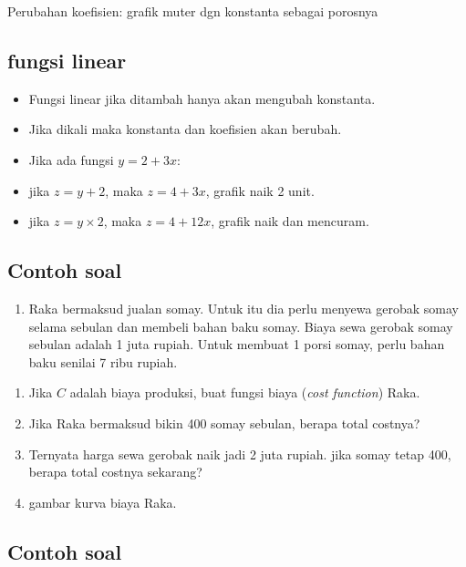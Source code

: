 \documentclass[
  letterpaper,
  DIV=11,
  numbers=noendperiod]{scrartcl}
\providecommand{\tightlist}{%
  \setlength{\itemsep}{0pt}\setlength{\parskip}{0pt}}\usepackage{longtable,booktabs,array}
\begin{document}
Perubahan koefisien: grafik muter dgn konstanta sebagai porosnya

\hypertarget{fungsi-linear-3}{%
\subsection{fungsi linear}\label{fungsi-linear-3}}

\begin{itemize}
\item
  Fungsi linear jika ditambah hanya akan mengubah konstanta.
\item
  Jika dikali maka konstanta dan koefisien akan berubah.
\item
  Jika ada fungsi \(y=2+3x\):
\item
  jika \(z=y+2\), maka \(z=4+3x\), grafik naik 2 unit.
\item
  jika \(z=y \times 2\), maka \(z=4+12x\), grafik naik dan mencuram.
\end{itemize}

\hypertarget{contoh-soal-1}{%
\subsection{Contoh soal}\label{contoh-soal-1}}

\begin{enumerate}
\def\labelenumi{\arabic{enumi}.}
\tightlist
\item
  Raka bermaksud jualan somay. Untuk itu dia perlu menyewa gerobak somay
  selama sebulan dan membeli bahan baku somay. Biaya sewa gerobak somay
  sebulan adalah 1 juta rupiah. Untuk membuat 1 porsi somay, perlu bahan
  baku senilai 7 ribu rupiah.
\end{enumerate}

\begin{enumerate}
\def\labelenumi{\alph{enumi}.}
\tightlist
\item
  Jika \(C\) adalah biaya produksi, buat fungsi biaya (\emph{cost
  function}) Raka.
\item
  Jika Raka bermaksud bikin 400 somay sebulan, berapa total costnya?
\item
  Ternyata harga sewa gerobak naik jadi 2 juta rupiah. jika somay tetap
  400, berapa total costnya sekarang?
\item
  gambar kurva biaya Raka.
\end{enumerate}

\hypertarget{contoh-soal-2}{%
\subsection{Contoh soal}\label{contoh-soal-2}}
\end{document}
